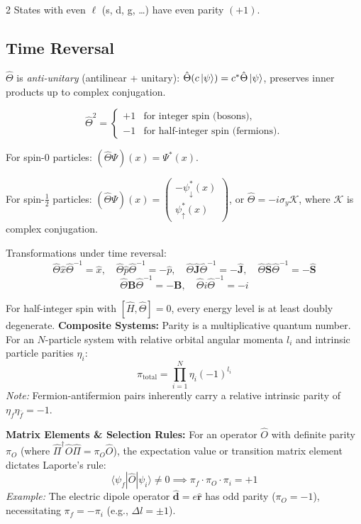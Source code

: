 \documentclass[9pt,a4paper]{article} %
\newcommand{\Hhat}{\hat{H}}
\newcommand{\phat}{\hat{p}}
\newcommand{\xhat}{\hat{x}}
\newcommand{\Jop}{\hat{\mathbf{J}}}
\newcommand{\Sop}{\hat{\mathbf{S}}}
\begin{document}
\begin{multicols}{2}
States with even $\ell$ (s, d, g, \dots) have even parity $(+1)$.

\subsection{Time Reversal}
$\hat{\Theta}$ is \emph{anti-unitary} (antilinear + unitary): $\hat{\Theta}(c\ket{\psi})=c^*\hat{\Theta}\ket{\psi}$, preserves inner products up to complex conjugation.

\[
\hat{\Theta}^2 =
\begin{cases}
+1 & \text{for integer spin (bosons)}, \\
-1 & \text{for half-integer spin (fermions)}.
\end{cases}
\]


For spin-0 particles: $(\hat{\Theta} \Psi)(x) = \Psi^*(x)$.

For spin-$\frac{1}{2}$ particles: $(\hat{\Theta} \Psi)(x) = \begin{pmatrix} -\psi_\downarrow^*(x) \\ \psi_\uparrow^*(x) \end{pmatrix}$, or $\hat{\Theta} = -i \sigma_y \mathcal{K}$, where $\mathcal{K}$ is complex conjugation.


Transformations under time reversal:
\[
\hat{\Theta} \xhat \hat{\Theta}^{-1} = \xhat, \quad \hat{\Theta} \phat \hat{\Theta}^{-1} = -\phat, \quad \hat{\Theta} \Jop \hat{\Theta}^{-1} = -\Jop, \quad \hat{\Theta} \Sop \hat{\Theta}^{-1} = -\Sop
\]
\[
\hat{\Theta} \mathbf{B} \hat{\Theta}^{-1} = -\mathbf{B}, \quad \hat{\Theta} i \hat{\Theta}^{-1} = -i
\]

For half-integer spin with $[\Hhat,\hat{\Theta}]=0$, every energy level is at least doubly degenerate.
\textbf{Composite Systems:} Parity is a multiplicative quantum number. For an $N$-particle system with relative orbital angular momenta $l_i$ and intrinsic particle parities $\eta_i$:
\begin{equation*}
    \pi_{\text{total}} = \prod_{i=1}^N \eta_i (-1)^{l_i}
\end{equation*}
\textit{Note:} Fermion-antifermion pairs inherently carry a relative intrinsic parity of $\eta_f \eta_{\bar{f}} = -1$.

\textbf{Matrix Elements \& Selection Rules:} 
For an operator $\hat{O}$ with definite parity $\pi_O$ (where $\hat{\Pi}^\dagger \hat{O} \hat{\Pi} = \pi_O \hat{O}$), the expectation value or transition matrix element dictates Laporte's rule:
\begin{equation*}
    \langle \psi_f | \hat{O} | \psi_i \rangle \neq 0 \implies \pi_f \cdot \pi_O \cdot \pi_i = +1
\end{equation*}
\textit{Example:} The electric dipole operator $\hat{\mathbf{d}} = e\hat{\mathbf{r}}$ has odd parity ($\pi_O = -1$), necessitating $\pi_f = -\pi_i$ (e.g., $\Delta l = \pm 1$).

\end{multicols}
\end{document}
